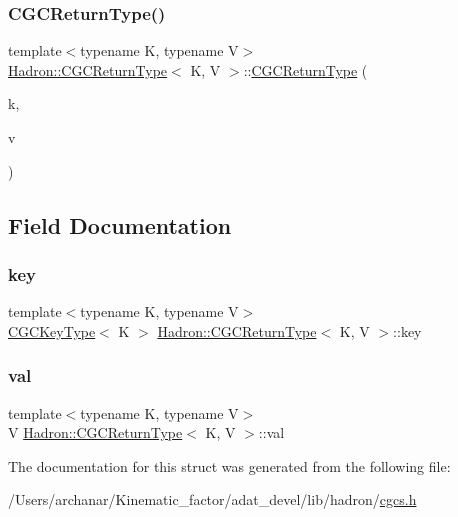 \subsubsection{\texorpdfstring{CGCReturnType()}{CGCReturnType()}\hspace{0.1cm}{\footnotesize\ttfamily [4/4]}}
{\footnotesize\ttfamily template$<$typename K, typename V$>$ \\
\mbox{\hyperlink{structHadron_1_1CGCReturnType}{Hadron\+::\+C\+G\+C\+Return\+Type}}$<$ K, V $>$\+::\mbox{\hyperlink{structHadron_1_1CGCReturnType}{C\+G\+C\+Return\+Type}} (\begin{DoxyParamCaption}\item[{const \mbox{\hyperlink{structHadron_1_1CGCKeyType}{C\+G\+C\+Key\+Type}}$<$ K $>$ \&}]{k,  }\item[{const V \&}]{v }\end{DoxyParamCaption})\hspace{0.3cm}{\ttfamily [inline]}}



\subsection{Field Documentation}
\mbox{\label{structHadron_1_1CGCReturnType_a1101bfc0c0d7cd166d32992058e4aa6c}} 
\subsubsection{\texorpdfstring{key}{key}}
{\footnotesize\ttfamily template$<$typename K, typename V$>$ \\
\mbox{\hyperlink{structHadron_1_1CGCKeyType}{C\+G\+C\+Key\+Type}}$<$ K $>$ \mbox{\hyperlink{structHadron_1_1CGCReturnType}{Hadron\+::\+C\+G\+C\+Return\+Type}}$<$ K, V $>$\+::key}

\mbox{\label{structHadron_1_1CGCReturnType_ae84be939a57b9598ac24e018e399cc38}} 
\subsubsection{\texorpdfstring{val}{val}}
{\footnotesize\ttfamily template$<$typename K, typename V$>$ \\
V \mbox{\hyperlink{structHadron_1_1CGCReturnType}{Hadron\+::\+C\+G\+C\+Return\+Type}}$<$ K, V $>$\+::val}



The documentation for this struct was generated from the following file\+:\begin{DoxyCompactItemize}
\item 
/\+Users/archanar/\+Kinematic\+\_\+factor/adat\+\_\+devel/lib/hadron/\mbox{\hyperlink{lib_2hadron_2cgcs_8h}{cgcs.\+h}}\end{DoxyCompactItemize}
